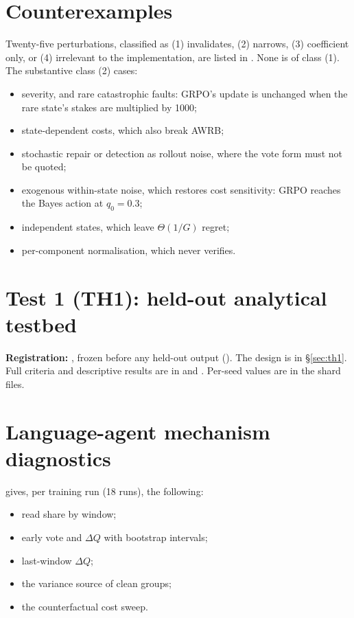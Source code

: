 \section{Counterexamples}\label{app3:counter}
Twenty-five perturbations, classified as (1) invalidates, (2) narrows, (3) coefficient only, or (4) irrelevant to the
implementation, are listed in . None is of class (1). The substantive class (2)
cases:
\begin{itemize}
\item severity, and rare catastrophic faults: GRPO's update is unchanged when the rare state's stakes are multiplied
by 1000;
\item state-dependent costs, which also break AWRB;
\item stochastic repair or detection as rollout noise, where the vote form must not be quoted;
\item exogenous within-state noise, which restores cost sensitivity: GRPO reaches the Bayes action at $q_0=0.3$;
\item independent states, which leave $\Theta(1/G)$ regret;
\item per-component normalisation, which never verifies.
\end{itemize}

\section{Test 1 (TH1): held-out analytical testbed}\label{app3:th1}
\textbf{Registration:} , frozen before any held-out output
(). The design is in \S\ref{sec:th1}. Full criteria and descriptive results are in
 and . Per-seed values are in
the shard files.

\section{Language-agent mechanism diagnostics}\label{app3:mech}
 gives, per training run (18 runs), the following:
\begin{itemize}
\item read share by window;
\item early vote and $\Delta Q$ with bootstrap intervals;
\item last-window $\Delta Q$;
\item the variance source of clean groups;
\item the counterfactual cost sweep.
\end{itemize}

